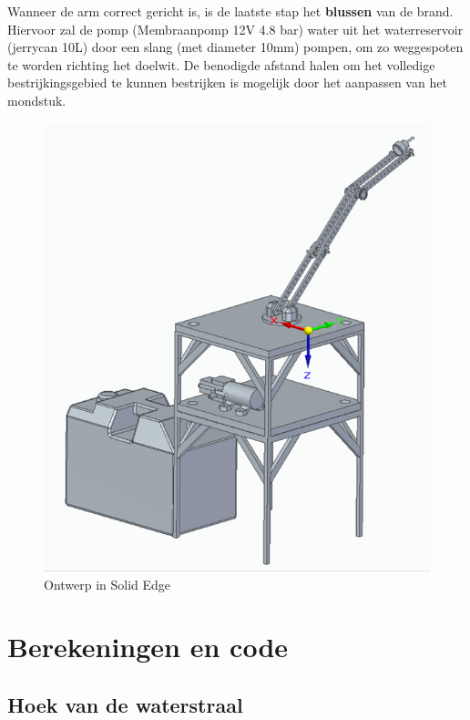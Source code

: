 \documentclass[kulak]{kulakarticle} %
\begin{document}
Wanneer de arm correct gericht is, is de laatste stap het \textbf{blussen} van de brand. Hiervoor zal de pomp (Membraanpomp 12V 4.8 bar) water uit het waterreservoir (jerrycan 10L) door een slang (met diameter 10mm) pompen, om zo weggespoten te worden richting het doelwit. De benodigde afstand halen om het volledige bestrijkingsgebied te kunnen bestrijken is mogelijk door het aanpassen van het mondstuk.\\

\begin{figure} [!h]
	\centering
	\includegraphics[width = .6 \textwidth]{Solid Edge Assembly foto}
	\caption{Ontwerp in Solid Edge}
	\label{ontwerp}
\end{figure}



\section{Berekeningen en code}
\subsection{Hoek van de waterstraal}
\end{document}
